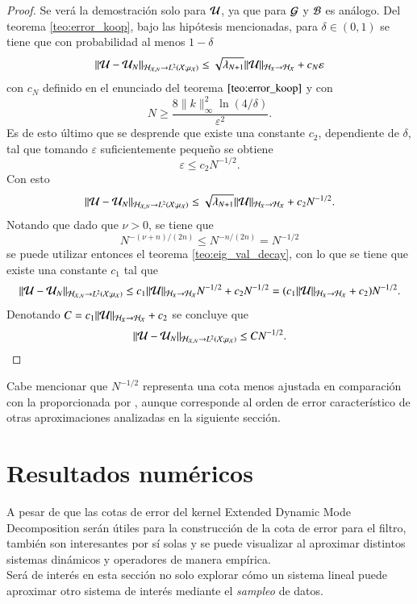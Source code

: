 \begin{proof}
    Se verá la demostración solo para $\mathcal{U}$, ya que para $\mathcal{G}$ y $\mathcal{B}$ es análogo. Del teorema \ref{teo:error_koop}, bajo las hipótesis mencionadas, para $\delta \in (0, 1)$ se tiene que con probabilidad al menos $1-\delta$
    \[
    \|\mathcal{U} - \mathcal{U}_N \|_{\mathcal{H}_{\mathcal{X}, N} \to L^2(\mathcal{X}; \mu_{\mathcal{X}})} \leq \sqrt{\lambda_{N+1}} \|\mathcal{U} \|_{\mathcal{H}_{X} \to \mathcal{H_{\mathcal{X}}}} + c_N \varepsilon
    \]
    con $c_N$ definido en el enunciado del teorema $\ref{teo:error_koop}$ y con 
    \begin{equation*}
        N \geq \frac{8\|k\|^2_\infty \ln(4/\delta)}{\varepsilon^2}.
    \end{equation*}
    Es de esto último que se desprende que existe una constante $c_2$, dependiente de $\delta$, tal que tomando $\varepsilon$ suficientemente pequeño se obtiene
    \begin{equation*}
        \varepsilon \leq c_2 N^{-1/2}.
    \end{equation*}
    Con esto
    \[
    \|\mathcal{U} - \mathcal{U}_N \|_{\mathcal{H}_{\mathcal{X}, N} \to L^2(\mathcal{X}; \mu_{\mathcal{X}})} \leq \sqrt{\lambda_{N+1}} \|\mathcal{U} \|_{\mathcal{H}_{X} \to \mathcal{H_{\mathcal{X}}}} + c_2 N^{-1/2}.
    \]
    Notando que dado que $\nu > 0$, se tiene que 
    \begin{equation*}
        N^{-(\nu + n)/(2n)} \leq N^{-n/(2n)} = N^{-1/2}
    \end{equation*}
    se puede utilizar entonces el teorema \ref{teo:eig_val_decay}, con lo que se tiene que existe una constante $c_1$ tal que
    \[
    \|\mathcal{U} - \mathcal{U}_N \|_{\mathcal{H}_{\mathcal{X}, N} \to L^2(\mathcal{X}; \mu_{\mathcal{X}})} \leq c_1 \|\mathcal{U} \|_{\mathcal{H}_{X} \to \mathcal{H_{\mathcal{X}}}} N^{-1/2} + c_2 N^{-1/2} = (c_1 \|\mathcal{U} \|_{\mathcal{H}_{X} \to \mathcal{H_{\mathcal{X}}}} + c_2) N^{-1/2}.
    \]
    Denotando $C = c_1 \|\mathcal{U} \|_{\mathcal{H}_{X} \to \mathcal{H_{\mathcal{X}}}} + c_2$ se concluye que
    \[
    \|\mathcal{U} - \mathcal{U}_N \|_{\mathcal{H}_{\mathcal{X}, N} \to L^2(\mathcal{X}; \mu_{\mathcal{X}})} \leq C N^{-1/2}.
    \]
\end{proof}

Cabe mencionar que \( N^{-1/2} \) representa una cota menos ajustada en comparación con la proporcionada por \cite{Philipp2024ErrorOperator}, aunque corresponde al orden de error característico de otras aproximaciones analizadas en la siguiente sección.

\section{Resultados numéricos}

A pesar de que las cotas de error del kernel Extended Dynamic Mode Decomposition serán útiles para la construcción de la cota de error para el filtro, también son interesantes por sí solas y se puede visualizar al aproximar distintos sistemas dinámicos y operadores de manera empírica.\\
Será de interés en esta sección no solo explorar cómo un sistema lineal puede aproximar otro sistema de interés mediante el \textit{sampleo} de datos.

